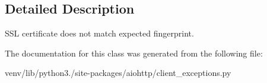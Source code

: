 \subsection{Detailed Description}
\begin{DoxyVerb}SSL certificate does not match expected fingerprint.\end{DoxyVerb}
 

The documentation for this class was generated from the following file\+:\begin{DoxyCompactItemize}
\item 
venv/lib/python3./site-\/packages/aiohttp/client\+\_\+exceptions.\+py\end{DoxyCompactItemize}
